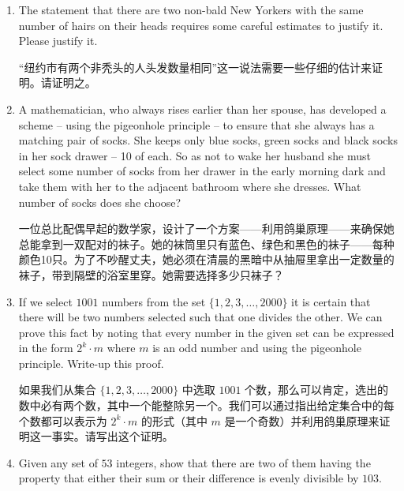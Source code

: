 \begin{enumerate}

    \item The statement that there are two non-bald New Yorkers with
    the same number of hairs on their heads requires some careful 
    estimates to justify it. Please justify it.
    
    \noindent “纽约市有两个非秃头的人头发数量相同”这一说法需要一些仔细的估计来证明。请证明之。
    
    \wbvfill
    
    \item A mathematician, who always rises earlier than her spouse, has
    developed a scheme -- using the pigeonhole principle -- to ensure that
    she always has a matching pair of socks. She keeps only blue socks, green 
    socks and
    black socks in her sock drawer -- 10 of each. So as not to wake her 
    husband she must
    select some number of socks from her drawer in the early morning dark
    and take them with her to the adjacent bathroom where she dresses. What number of socks does she choose?
    
    \noindent 一位总比配偶早起的数学家，设计了一个方案——利用鸽巢原理——来确保她总能拿到一双配对的袜子。她的袜筒里只有蓝色、绿色和黑色的袜子——每种颜色10只。为了不吵醒丈夫，她必须在清晨的黑暗中从抽屉里拿出一定数量的袜子，带到隔壁的浴室里穿。她需要选择多少只袜子？
    
    \wbvfill
    
    \workbookpagebreak
    
    \item If we select $1001$ numbers from the set $\{1, 2, 3, \ldots, 2000\}$
    it is certain that there will be two numbers selected such that one divides
    the other. We can prove this fact by noting that every number in the given
    set can be expressed in the form $2^k \cdot m$ where $m$ is an odd number
    and using the pigeonhole principle. Write-up this proof.
    
    \noindent 如果我们从集合 $\{1, 2, 3, \ldots, 2000\}$ 中选取 $1001$ 个数，那么可以肯定，选出的数中必有两个数，其中一个能整除另一个。我们可以通过指出给定集合中的每个数都可以表示为 $2^k \cdot m$ 的形式（其中 $m$ 是一个奇数）并利用鸽巢原理来证明这一事实。请写出这个证明。
    
    \wbvfill
    
    \item Given any set of $53$ integers, show that there are two of them
    having the property 
    that either their sum or their difference is evenly divisible by $103$.
    

\end{enumerate}
